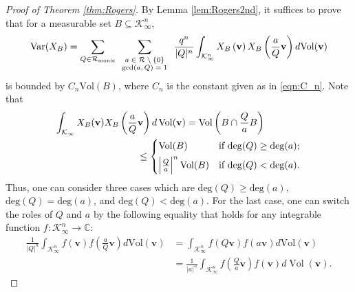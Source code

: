 \documentclass[11pt,a4paper,reqno]{amsart}
\def\gcd{\mathrm{gcd}}
\def\deg{\mathrm{deg}}
\def\vol{\mathrm{Vol}}
\newcommand{\Rmo}{\mathcal R_{\text{monic}}}
\theoremstyle{definition}
\theoremstyle{remark}
\numberwithin{equation}{section}
\begin{document}
\begin{proof}[Proof of Theorem \ref{thm:Rogers}]
By Lemma \ref{lem:Rogers2nd}, it suffices to prove that for a measurable set $B\subseteq \mathcal K_\infty^n$,
\begin{equation}\label{eqn:var}\begin{split}
\operatorname{Var}(X_{B})
=\sum_{Q\in \Rmo}
    \sum_{\scriptsize \begin{array}{c}
    a\in \mathcal R\setminus \{0\}\\
    \gcd(a,Q)=1
    \end{array}} \frac {q^n}{|Q|^n} \int_{\mathcal K_\infty^n} X_B\left(\mathbf v\right)X_B\left(\frac {a} {Q}\mathbf v\right) d\vol(\mathbf v)
\end{split}\end{equation}
is bounded by $C_n\vol(B)$, where $C_n$ is the constant given as in \eqref{eqn:C_n}.
Note that 
\begin{equation}\label{eqn:VolBND}\begin{split}
    \int_{\mathcal{K}_{\infty}}X_B(\mathbf{v})X_B\left(\frac{a}{Q}\mathbf{v}\right)d\operatorname{Vol}(\mathbf{v})
    &=\operatorname{Vol}\left(B\cap \frac{Q}{a}B\right)\\
    &\hspace{-0.7in}\leq \begin{cases}
    \operatorname{Vol}(B)& \text{if }\deg(Q)\ge \deg(a);\\[0.05in]
    \left|\frac{Q}{a}\right|^n\operatorname{Vol}(B)& \text{if }\deg(Q)<\deg(a).
\end{cases}\end{split}\end{equation}
Thus, one can consider three cases which are $\deg(Q)\ge \deg(a)$, $\deg(Q)=\deg(a)$, and $\deg(Q)<\deg(a)$. For the last case, one can switch the roles of $Q$ and $a$ by the following equality that holds for any integrable function $f:\mathcal K_\infty^n \rightarrow \mathbb C$:
\begin{equation}\label{eqn:symmetry}\begin{split}
\frac 1 {|Q|^n} \int_{\mathcal K^n_\infty} f\left(\mathbf v\right)f\left( \frac a Q \mathbf v\right) d\vol(\mathbf v)
&=\int_{\mathcal K^n_\infty} f\left(Q\mathbf v\right)f\left( a\mathbf v \right) d\vol(\mathbf v)\\
&=\frac 1 {|a|^n} \int_{\mathcal K^n_\infty} f\left(\frac Q a \mathbf v\right)f\left(\mathbf v\right)d\operatorname{Vol}(\mathbf{v}).
\end{split}\end{equation}

\end{proof}
\end{document}
